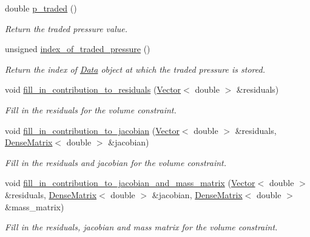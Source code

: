 \begin{DoxyCompactItemize}
double \hyperlink{classoomph_1_1VolumeConstraintElement_aab138c0a3af1e72089d5bed31a633974}{p\+\_\+traded} ()
\begin{DoxyCompactList}\small\item\em Return the traded pressure value. \end{DoxyCompactList}\item 
unsigned \hyperlink{classoomph_1_1VolumeConstraintElement_ada831157effca052df0fae723c21c426}{index\+\_\+of\+\_\+traded\+\_\+pressure} ()
\begin{DoxyCompactList}\small\item\em Return the index of \hyperlink{classoomph_1_1Data}{Data} object at which the traded pressure is stored. \end{DoxyCompactList}\item 
void \hyperlink{classoomph_1_1VolumeConstraintElement_a15162ac88c571496cc4f9ab5afa51c52}{fill\+\_\+in\+\_\+contribution\+\_\+to\+\_\+residuals} (\hyperlink{classoomph_1_1Vector}{Vector}$<$ double $>$ \&residuals)
\begin{DoxyCompactList}\small\item\em Fill in the residuals for the volume constraint. \end{DoxyCompactList}\item 
void \hyperlink{classoomph_1_1VolumeConstraintElement_a725474b173e3887f5f7e025acf768b28}{fill\+\_\+in\+\_\+contribution\+\_\+to\+\_\+jacobian} (\hyperlink{classoomph_1_1Vector}{Vector}$<$ double $>$ \&residuals, \hyperlink{classoomph_1_1DenseMatrix}{Dense\+Matrix}$<$ double $>$ \&jacobian)
\begin{DoxyCompactList}\small\item\em Fill in the residuals and jacobian for the volume constraint. \end{DoxyCompactList}\item 
void \hyperlink{classoomph_1_1VolumeConstraintElement_af2a5a59f7fa5f2570d2d490f3610de61}{fill\+\_\+in\+\_\+contribution\+\_\+to\+\_\+jacobian\+\_\+and\+\_\+mass\+\_\+matrix} (\hyperlink{classoomph_1_1Vector}{Vector}$<$ double $>$ \&residuals, \hyperlink{classoomph_1_1DenseMatrix}{Dense\+Matrix}$<$ double $>$ \&jacobian, \hyperlink{classoomph_1_1DenseMatrix}{Dense\+Matrix}$<$ double $>$ \&mass\+\_\+matrix)
\begin{DoxyCompactList}\small\item\em Fill in the residuals, jacobian and mass matrix for the volume constraint. \end{DoxyCompactList}\end{DoxyCompactItemize}
